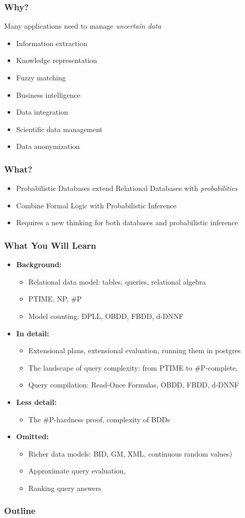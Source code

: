 \documentclass{beamer}
\newcommand{\bi}{\begin{itemize}}
\newcommand{\ei}{\end{itemize}}
\newcommand{\ii}{\item}
\newcommand*{\myblue}[1]{\textcolor{myblue}{#1}}
\newcommand*{\myred}[1]{\textcolor{myred}{#1}}
\begin{document}
\begin{frame}
\frametitle{Why?}
Many applications need to manage \myred{\textit{uncertain data}}
\bi
\ii Information extraction
\ii Knowledge representation
\ii Fuzzy matching
\ii Business intelligence
\ii Data integration
\ii Scientific data management
\ii Data anonymization
\ei
\end{frame}


\begin{frame}
\frametitle{What?}
\bi
\ii \myblue{Probabilistic Databases} extend Relational Databases with \myred{\textit{probabilities}}

\ii Combine \myblue{Formal Logic} with \myred{Probabilistic Inference}

\ii Requires a new thinking for both databases and probabilistic inference

\ei
\end{frame}


\begin{frame}
\frametitle{What You Will Learn}
\bi
\ii \textbf{Background:}
\bi
\ii Relational data model: tables, queries, relational algebra
\ii PTIME, NP, \#P
\ii Model counting: DPLL, OBDD, FBDD, d-DNNF
\ei
\ei

\bi
\ii \textbf{In detail:}
\bi
\ii Extensional plans, extensional evaluation, running them in postgres
\ii The landscape of query complexity: from PTIME to  \#P-complete,
\ii Query compilation: Read-Once Formulas, OBDD, FBDD, d-DNNF
\ei
\ei

\bi
\ii \textbf{Less detail:}
\bi
\ii The \#P-hardness proof, complexity of BDDs
\ei
\ei

\bi
\ii \textbf{Omitted:}
\bi
\ii Richer data models: BID, GM, XML, continuous random values)
\ii Approximate query evaluation,
\ii Ranking query answers
\ei
\ei

\end{frame}



\begin{frame}
\frametitle{Outline} %
\tableofcontents 
\end{frame}
\end{document}

